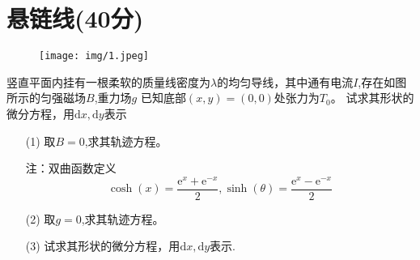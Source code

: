 \documentclass{article}
\begin{document}
\section*{悬链线(40分)}
\begin{wrapfigure}{r}{7cm}
	\vspace{-15pt}    %
	\texttt{[image: img/1.jpeg]}\\
	\vspace{-15pt}    %
	\caption{}
	\vspace{-15pt}    %
\end{wrapfigure}
竖直平面内挂有一根柔软的质量线密度为$\lambda$的均匀导线，其中通有电流$I$,存在如图所示的匀强磁场$B$,重力场$g$
已知底部$(x,y)=(0,0)$处张力为$T_0$。
试求其形状的微分方程，用$\mathrm{d}x,\mathrm{d}y$表示
\begin{itemize}
\item[(1)]取$B=0$,求其轨迹方程。\par
    注：双曲函数定义
    $$
    \cosh(x)=\dfrac{\mathrm{e}^{x}+\mathrm{e}^{-x}}{2},\sinh(\theta)=\dfrac{\mathrm{e}^{x}-\mathrm{e}^{-x}}{2}
    $$
\item[(2)]取$g=0$,求其轨迹方程。
\item[(3)]试求其形状的微分方程，用$\mathrm{d}x,\mathrm{d}y$表示.  
\end{itemize}
\end{document}
